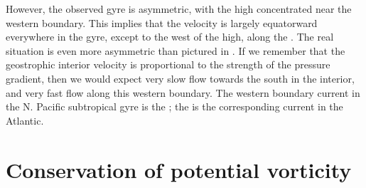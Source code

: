 However, the observed gyre is asymmetric, with the high concentrated near the western boundary. This implies that the velocity is largely equatorward everywhere in the gyre, except to the west of the high, along the . The real situation is even more asymmetric than pictured in .  If we remember that the geostrophic interior velocity is proportional to the strength of the pressure gradient, then we would expect very slow flow towards the south in the interior, and very fast flow along this western boundary.  The western boundary current in the N. Pacific subtropical gyre is the ; the  is the corresponding current in the Atlantic.  

\section{Conservation of potential vorticity}

